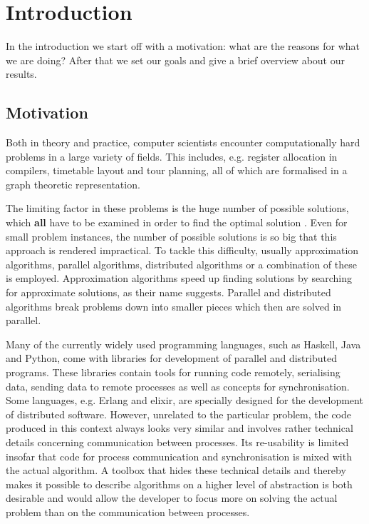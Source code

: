 \chapter{Introduction}
\vspace*{-0.5em}
In the introduction we start off with a motivation: what are the reasons for what we are doing? After that we set our goals and give a brief overview about our results.

\vspace*{-0.5em}
\section{Motivation}
Both in theory and practice, computer scientists encounter computationally hard problems in a large variety of fields. This includes, e.g. register allocation in compilers, timetable layout and tour planning, all of which are formalised in a graph theoretic \cite{Garey:1979:CIG:578533} representation.

The limiting factor in these problems is the huge number of possible solutions, which \textbf{all} have to be examined in order to find the optimal solution \cite{Garey:1979:CIG:578533}. Even for small problem instances, the number of possible solutions is so big that this approach is rendered impractical. To tackle this difficulty, usually approximation algorithms, parallel algorithms, distributed algorithms or a combination of these is employed. Approximation algorithms speed up finding solutions by searching for approximate solutions, as their name suggests. Parallel and distributed algorithms break problems down into smaller pieces which then are solved in parallel.

Many of the currently widely used programming languages, such as \textsf{Haskell}, \textsf{Java} and \textsf{Python}, come with libraries for development of parallel and distributed programs. These libraries contain tools for running code remotely, serialising data, sending data to remote processes as well as concepts for synchronisation. Some languages, e.g. \textsf{Erlang} and \textsf{elixir}, are specially designed for the development of distributed software. However, unrelated to the particular problem, the code produced in this context always looks very similar and involves rather technical details concerning communication between processes. Its re-usability is limited insofar that code for process communication and synchronisation is mixed with the actual algorithm. A toolbox that hides these technical details and thereby makes it possible to describe algorithms on a higher level of abstraction is both desirable and would allow the developer to focus more on solving the actual problem than on the communication between processes.

